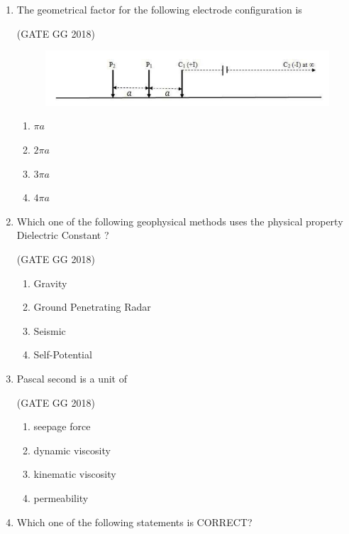\documentclass[journal]{IEEEtran}
\begin{document}
\begin{enumerate}[start=1]
\item The geometrical factor for the following electrode configuration is  

\hfill(GATE GG 2018)
 \begin{figure}[H]
        \centering
        \includegraphics[width=0.5\columnwidth]{figs/02.png}
        \caption*{}
        \label{fig:q10}
    \end{figure}
    \begin{multicols}{4}
\begin{enumerate}
\item $\pi a$
\item $2\pi a$
\item $3\pi a$
\item $4\pi a$
\end{enumerate}
\end{multicols}

\item Which one of the following geophysical methods uses the physical property Dielectric Constant ?  

\hfill(GATE GG 2018)
\begin{multicols}{2}
\begin{enumerate}
\item Gravity
\item Ground Penetrating Radar
\item Seismic
\item Self-Potential
\end{enumerate}
\end{multicols}

\item  Pascal second is a unit of  

\hfill(GATE GG 2018)
\begin{multicols}{2}
\begin{enumerate}
\item seepage force
\item dynamic viscosity
\item kinematic viscosity
\item permeability
\end{enumerate}
\end{multicols}

\item  Which one of the following statements is CORRECT?  


\end{enumerate}
\end{document}

